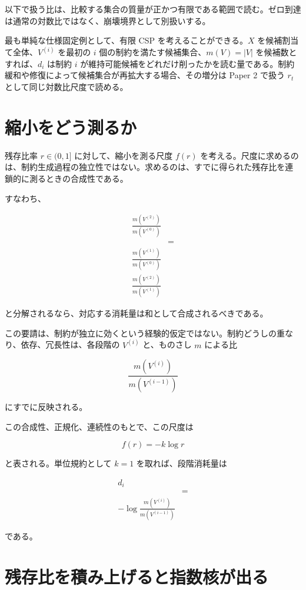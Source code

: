 \documentclass[12pt,a4paper]{article}
\begin{document}
以下で扱う比は、比較する集合の質量が正かつ有限である範囲で読む。ゼロ到達は通常の対数比ではなく、崩壊境界として別扱いする。

最も単純な仕様固定例として、有限 CSP を考えることができる。\(X\) を候補割当て全体、\(V^{(i)}\) を最初の \(i\) 個の制約を満たす候補集合、\(m(V)=|V|\) を候補数とすれば、\(d_{i}\) は制約 \(i\) が維持可能候補をどれだけ削ったかを読む量である。制約緩和や修復によって候補集合が再拡大する場合、その増分は Paper 2 で扱う \(r_{t}\) として同じ対数比尺度で読める。

\section{縮小をどう測るか}\label{ux7e2eux5c0fux3092ux3069ux3046ux6e2cux308bux304b}

残存比率 \(r\in(0,1]\) に対して、縮小を測る尺度 \(f(r)\) を考える。尺度に求めるのは、制約生成過程の独立性ではない。求めるのは、すでに得られた残存比を連鎖的に測るときの合成性である。

すなわち、

\[
\begin{aligned}
\frac{m(V^{(2)})}{m(V^{(0)})} \\
&= \\
\frac{m(V^{(1)})}{m(V^{(0)})} \\
\frac{m(V^{(2)})}{m(V^{(1)})}
\end{aligned}
\]

と分解されるなら、対応する消耗量は和として合成されるべきである。

この要請は、制約が独立に効くという経験的仮定ではない。制約どうしの重なり、依存、冗長性は、各段階の \(V^{(i)}\) と、ものさし \(m\) による比

\[
\frac{m(V^{(i)})}{m(V^{(i-1)})}
\]

にすでに反映される。

この合成性、正規化、連続性のもとで、この尺度は

\[
f(r)=-k\log r
\]

と表される。単位規約として \(k=1\) を取れば、段階消耗量は

\[
\begin{aligned}
d_{i} \\
&= \\
-\log\frac{m(V^{(i)})}{m(V^{(i-1)})}
\end{aligned}
\]

である。

\section{残存比を積み上げると指数核が出る}\label{ux6b8bux5b58ux6bd4ux3092ux7a4dux307fux4e0aux3052ux308bux3068ux6307ux6570ux6838ux304cux51faux308b}
\end{document}

